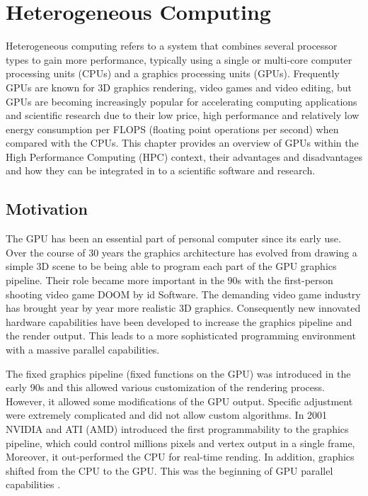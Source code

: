 

\chapter{Heterogeneous Computing} %

\label{Heterogeneous Computing} %


Heterogeneous computing refers to a system that combines several processor types to gain more performance, typically using a single or multi-core computer processing units (CPUs) and a  graphics processing units (GPUs).
Frequently GPUs are known for 3D graphics rendering, video games and video editing, but GPUs are becoming increasingly popular for accelerating computing applications and scientific research due to their low price, high performance and relatively low energy consumption per FLOPS (floating point operations per second) when compared with the CPUs. This chapter provides an overview of GPUs within the High Performance Computing (HPC) context, their advantages and disadvantages and how they can be integrated in to a scientific software and research.



\section{Motivation}

The GPU has been an essential part of personal computer since its early use. Over the course of 30 years the graphics architecture has evolved from drawing a simple 3D scene to be being able to program each part of the GPU graphics pipeline. Their role became more important in the 90s with the first-person shooting video game DOOM by id Software. The demanding video game industry has brought year by year more realistic 3D graphics. Consequently new innovated hardware capabilities have been developed to increase the graphics pipeline and the render output. This leads to a more sophisticated programming environment with a massive parallel capabilities.

The fixed graphics pipeline (fixed functions on the GPU) was introduced in the early 90s and this allowed various customization of the rendering process. However, it allowed some modifications of the GPU output. Specific adjustment were extremely complicated and did not allow custom algorithms. In 2001 NVIDIA and ATI (AMD) introduced the first programmability to the graphics pipeline, which could control millions pixels and vertex output in a single frame, Moreover, it out-performed the CPU for real-time rending. In addition, graphics shifted from the CPU to the GPU. This was the beginning of GPU parallel capabilities \cite{Nickolls}.

